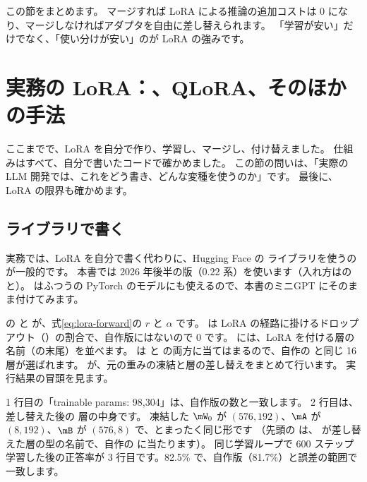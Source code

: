 この節をまとめます。
マージすれば LoRA による推論の追加コストは 0 になり、マージしなければアダプタを自由に差し替えられます。
「学習が安い」だけでなく、「使い分けが安い」のが LoRA の強みです。

\section{実務の LoRA：、QLoRA、そのほかの手法}\label{sec:lora-practice}

ここまでで、LoRA を自分で作り、学習し、マージし、付け替えました。
仕組みはすべて、自分で書いたコードで確かめました。
この節の問いは、「実際の LLM 開発では、これをどう書き、どんな変種を使うのか」です。
最後に、LoRA の限界も確かめます。

\subsection{ ライブラリで書く}\label{sec:lora-peft}

実務では、LoRA を自分で書く代わりに、Hugging Face の  ライブラリを使うのが一般的です。
本書では 2026 年後半の版（0.22 系）を使います（入れ方はのと）。
 はふつうの PyTorch のモデルにも使えるので、本書のミニGPT にそのまま付けてみます。


 の  と  が、式\eqref{eq:lora-forward}の $r$ と $\alpha$ です。
 は LoRA の経路に掛けるドロップアウト（）の割合で、自作版にはないので 0 です。
 には、LoRA を付ける層の名前（の末尾）を並べます。
 は  と  の両方に当てはまるので、自作の  と同じ 16 層が選ばれます。
 が、元の重みの凍結と層の差し替えをまとめて行います。
実行結果の冒頭を見ます。


1 行目の「trainable params: 98,304」は、自作版の数と一致します。
2 行目は、差し替えた後の  層の中身です。
凍結した $\mW_0$ が $(576, 192)$、$\mA$ が $(8, 192)$、$\mB$ が $(576, 8)$ で、とまったく同じ形です
（先頭の  は、 が差し替えた層の型の名前で、自作の  に当たります）。
同じ学習ループで 600 ステップ学習した後の正答率が 3 行目です。82.5\% で、自作版（81.7\%）と誤差の範囲で一致します。


